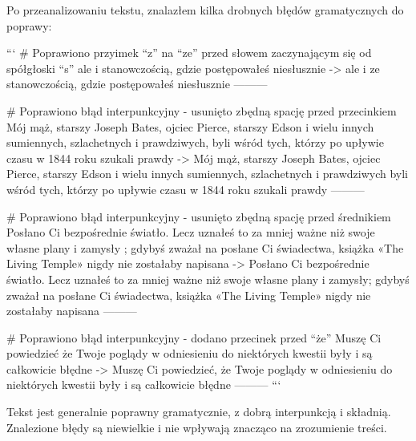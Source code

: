 Po przeanalizowaniu tekstu, znalazłem kilka drobnych błędów gramatycznych do poprawy:

```
# Poprawiono przyimek “z” na “ze” przed słowem zaczynającym się od spółgłoski “s”
ale i  stanowczością, gdzie postępowałeś niesłusznie
->
ale i ze stanowczością, gdzie postępowałeś niesłusznie
---------

# Poprawiono błąd interpunkcyjny - usunięto zbędną spację przed przecinkiem
Mój mąż, starszy Joseph Bates, ojciec Pierce, starszy Edson i wielu innych sumiennych, szlachetnych i prawdziwych, byli wśród tych, którzy po upływie czasu w 1844 roku szukali prawdy
->
Mój mąż, starszy Joseph Bates, ojciec Pierce, starszy Edson i wielu innych sumiennych, szlachetnych i prawdziwych byli wśród tych, którzy po upływie czasu w 1844 roku szukali prawdy
---------

# Poprawiono błąd interpunkcyjny - usunięto zbędną spację przed średnikiem
Posłano Ci bezpośrednie światło. Lecz uznałeś to za mniej ważne niż swoje własne plany i zamysły ; gdybyś zważał na posłane Ci świadectwa, książka «The Living Temple» nigdy nie zostałaby napisana
->
Posłano Ci bezpośrednie światło. Lecz uznałeś to za mniej ważne niż swoje własne plany i zamysły; gdybyś zważał na posłane Ci świadectwa, książka «The Living Temple» nigdy nie zostałaby napisana
---------

# Poprawiono błąd interpunkcyjny - dodano przecinek przed “że”
Muszę Ci powiedzieć że Twoje poglądy w odniesieniu do niektórych kwestii były i są całkowicie błędne
->
Muszę Ci powiedzieć, że Twoje poglądy w odniesieniu do niektórych kwestii były i są całkowicie błędne
---------
```

Tekst jest generalnie poprawny gramatycznie, z dobrą interpunkcją i składnią. Znalezione błędy są niewielkie i nie wpływają znacząco na zrozumienie treści.
